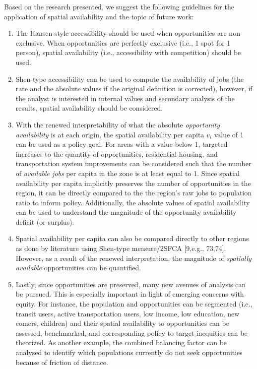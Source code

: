 \documentclass[10pt,letterpaper]{article}
\begin{document}
Based on the research presented, we suggest the following guidelines for
the application of spatial availability and the topic of future work:

\begin{enumerate}
\def\labelenumi{\arabic{enumi})}
\item
  The Hansen-style accessibility should be used when opportunities are
  non-exclusive. When opportunities are perfectly exclusive (i.e., 1
  spot for 1 person), spatial availability (i.e., accessibility with
  competition) should be used.
\item
  Shen-type accessibility can be used to compute the availability of
  jobs (the rate and the absolute values if the original definition is
  corrected), however, if the analyst is interested in internal values
  and secondary analysis of the results, spatial availability should be
  considered.
\item
  With the renewed interpretability of what the absolute
  \emph{opportunity availability} is at each origin, the spatial
  availability per capita \(v_i\) value of 1 can be used as a policy
  goal. For areas with a value below 1, targeted increases to the
  quantity of opportunities, residential housing, and transportation
  system improvements can be considered such that the number of
  \emph{available jobs} per capita in the zone is at least equal to 1.
  Since spatial availability per capita implicitly preserves the number
  of opportunities in the region, it can be directly compared to the the
  region's raw jobs to population ratio to inform policy. Additionally,
  the absolute values of spatial availability can be used to understand
  the magnitude of the opportunity availability deficit (or surplus).
\item
  Spatial availability per capita can also be compared directly to other
  regions as done by literature using Shen-type measure/2SFCA {[}9,e.g.,
  73,74{]}. However, as a result of the renewed interpretation, the
  magnitude of \emph{spatially available} opportunities can be
  quantified.
\item
  Lastly, since opportunities are preserved, many new avenues of
  analysis can be pursued. This is especially important in light of
  emerging concerns with equity. For instance, the population and
  opportunities can be segmented (i.e., transit users, active
  transportation users, low income, low education, new comers, children)
  and their spatial availability to opportunities can be assessed,
  benchmarked, and corresponding policy to target inequities can be
  theorized. As another example, the combined balancing factor can be
  analysed to identify which populations currently do not seek
  opportunities because of friction of distance.
\end{enumerate}
\end{document}

